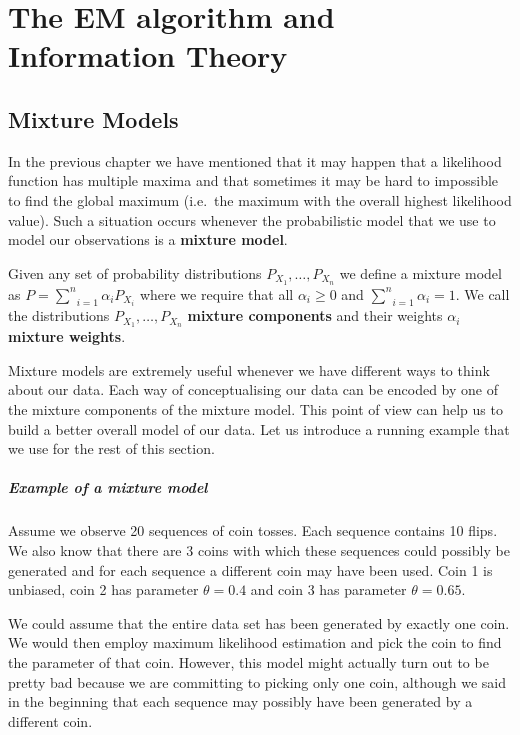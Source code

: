 \chapter{The EM algorithm and Information Theory}

\section{Mixture Models}\label{sec:mixtureModels}

In the previous chapter we have mentioned that it may happen that a likelihood function has multiple 
maxima and that sometimes it may be hard to impossible to find the global maximum (i.e.\ the maximum
with the overall highest likelihood value). Such a situation occurs whenever the probabilistic model
that we use to model our observations is a \textbf{mixture model}.

\begin{Definition}\label{def:mixtureModel}
Given any set of probability distributions $ P_{X_1}, \ldots, P_{X_n} $ 
we define a mixture model as
$ P = \underset{i=1}{\overset{n}{\sum}} \alpha_{i}P_{X_i} $
where we require that all $ \alpha_{i} \geq 0$ and 
$ \underset{i=1}{\overset{n}{\sum}} \alpha_{i} = 1 $.
We call the distributions $ P_{X_1}, \ldots, P_{X_n} $ \textbf{mixture components} and their weights
$ \alpha_{i} $ \textbf{mixture weights}.
\end{Definition}

Mixture models are extremely useful whenever we have different ways to think about our data. Each way
of conceptualising our data can be encoded by one of the mixture components of the mixture model.
This point of view can help us to build a better overall model of our data. Let us introduce a running example that
we use for the rest of this section. 

\paragraph{Example of a mixture model} Assume we observe 20 sequences of coin tosses. Each sequence
contains 10 flips. We also know that there are 3 coins with which these sequences could possibly be
generated and for each sequence a different coin may have been used. Coin 1 is unbiased, coin 2 has
parameter $ \theta = 0.4 $ and coin 3 has parameter $ \theta = 0.65 $. 
 
We could assume that the entire data set has been generated by exactly one coin. We would then employ maximum likelihood estimation 
and pick the coin to find the parameter of that coin. However, this model might actually turn out to be
pretty bad because we are committing to picking only one coin, although we said in the beginning that
each sequence may possibly have been generated by a different coin. 

